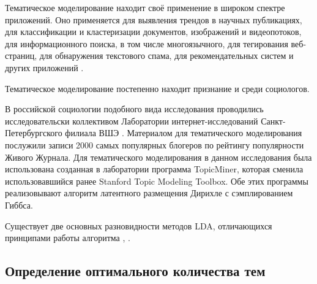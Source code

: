 Тематическое моделирование находит своё применение в широком спектре приложений. Оно применяется для выявления трендов в научных публикациях, для классификации и кластеризации документов, изображений и видеопотоков, для информационного поиска, в том числе многоязычного, для тегирования веб-страниц, для обнаружения текстового спама, для рекомендательных систем и других приложений \cite[стр. 4]{voroncov2013}. 

Тематическое моделирование постепенно находит признание и среди социологов.

В российской социологии подобного вида исследования проводились исследовательски коллективом Лаборатории интернет-исследований Санкт-Петербургского филиала ВШЭ \cite{kolcovalda}. Материалом для тематического моделирования послужили записи 2000 самых популярных блогеров по рейтингу популярности Живого Журнала. Для тематического моделирования в данном исследования была использована созданная в лаборатории программа TopicMiner, которая сменила использовавшийся ранее Stanford Topic Modeling Toolbox. Обе этих программы реализовывают алгоритм латентного размещения Дирихле с сэмплированием Гиббса. 

Существует две основных разновидности методов LDA, отличающихся принципами работы алгоритма \cite{kolcovaJJ}, \cite[стр. 1]{HoffmanBB10}.



\subsection{Определение оптимального количества тем}


\clearpage